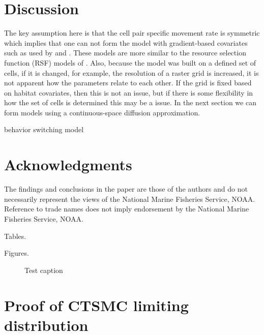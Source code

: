 \documentclass[12pt]{article}
\begin{document}
\section{Discussion}


The key assumption here is that the cell pair specific movement rate is symmetric which implies that one can not form the model with gradient-based covariates such as used by \cite{Hanks:2015aa} and \cite{wilsonestimating}. These models are more similar to the resource selection function (RSF) models of \cite{Johnson:2008kx, Johnson:2013fk}. Also, because the model was built on a defined set of cells, if it is changed, for example, the resolution of a raster grid is increased, it is not apparent how the parameters relate to each other. If the grid is fixed based on habitat covariates, then this is not an issue, but if there is some flexibility in how the set of cells is determined this may be a issue. In the next section we can form models using a continuous-space diffusion approximation. 

behavior switching model



\section*{Acknowledgments}
The findings and conclusions in the paper are those of the authors and do not necessarily represent the views of the National Marine Fisheries Service, NOAA. Reference to trade names does not imply endorsement by the National Marine Fisheries Service, NOAA.




\clearpage

Tables.

\clearpage

Figures.

\begin{figure}
\caption{Test caption}
\end{figure}


\clearpage

\appendix 

\section{Proof of CTSMC limiting distribution}
\end{document}
